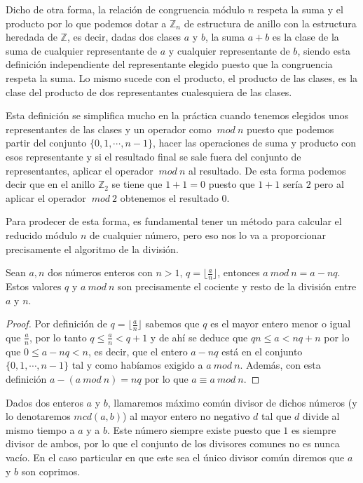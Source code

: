 Dicho de otra forma, la relaci\'on de congruencia m\'odulo $n$ respeta la suma y el
producto por lo que podemos dotar a ${\mathbb Z}_n$ de estructura de anillo con la
estructura heredada de ${\mathbb Z}$, es decir, dadas dos clases $a$ y $b$, la suma
$a+b$ es la clase de la suma de cualquier representante de $a$ y cualquier
representante de $b$, siendo esta definici\'on independiente del representante
elegido puesto que la congruencia respeta la suma. Lo mismo sucede con el producto,
el producto de las clases, es la clase del producto de dos representantes
cualesquiera de las clases.

Esta definici\'on se simplifica mucho en la pr\'actica
cuando tenemos elegidos unos representantes de las clases y un operador como $~mod~n$
puesto que podemos partir del conjunto $\{0,1,\cdots,n-1\}$, hacer las operaciones de suma
y producto con esos representante y si el resultado final se sale fuera del conjunto de
representantes, aplicar el operador $~mod~n$ al resultado. De esta forma podemos decir
que en el anillo ${\mathbb Z}_2$ se tiene que $1+1=0$ puesto que $1+1$ ser\'ia $2$
pero al aplicar el operador $~mod~2$ obtenemos el resultado $0$.

Para prodecer de esta forma, es fundamental tener un m\'etodo para calcular el reducido
m\'odulo $n$ de cualquier n\'umero, pero eso nos lo va a proporcionar precisamente el
algoritmo de la divisi\'on.

\begin{proposition}
Sean $a,n$ dos n\'umeros enteros con $n > 1$, $q = \lfloor \frac{a}{n} \rfloor$,
entonces $a~mod~n = a-nq$. Estos valores $q$ y $a~mod~n$ son precisamente el
cociente y resto de la divisi\'on entre $a$ y $n$.
\end{proposition}
\begin{proof}
Por definici\'on de $q = \lfloor \frac{a}{n} \rfloor$ sabemos que $q$ es el mayor entero
menor o igual que $\frac{a}{n}$, por lo tanto $q \leq \frac{a}{n} < q+1$ y de ah\'i se
deduce que $qn \leq a < nq+n$ por lo que $0 \leq a-nq < n$, es decir, que el entero
$a-nq$ est\'a en el conjunto $\{0,1,\cdots,n-1\}$ tal y como hab\'iamos exigido a
$a~mod~n$. Adem\'as, con esta definici\'on $a-(a~mod~n) = nq$ por lo que
$a \equiv a~mod~n$.
\end{proof}

\begin{definition}
Dados dos enteros $a$ y $b$, llamaremos m\'aximo com\'un divisor de dichos n\'umeros
(y lo denotaremos $mcd(a,b)$)
al mayor entero no negativo $d$ tal que $d$ divide al mismo tiempo a $a$ y a $b$. Este
n\'umero siempre existe puesto que $1$ es siempre divisor de ambos, por lo que el conjunto
de los divisores comunes no es nunca vac\'io. En el caso particular en que este sea el
\'unico divisor com\'un diremos que $a$ y $b$ son coprimos.
\end{definition}

